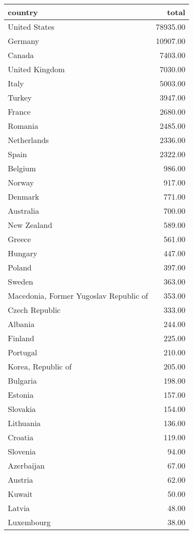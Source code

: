 \begin{table}[ht]
\centering
\begin{tabular}{lr}
  \hline
country & total \\ 
  \hline
United States & 78935.00 \\ 
  Germany & 10907.00 \\ 
  Canada & 7403.00 \\ 
  United Kingdom & 7030.00 \\ 
  Italy & 5003.00 \\ 
  Turkey & 3947.00 \\ 
  France & 2680.00 \\ 
  Romania & 2485.00 \\ 
  Netherlands & 2336.00 \\ 
  Spain & 2322.00 \\ 
  Belgium & 986.00 \\ 
  Norway & 917.00 \\ 
  Denmark & 771.00 \\ 
  Australia & 700.00 \\ 
  New Zealand & 589.00 \\ 
  Greece & 561.00 \\ 
  Hungary & 447.00 \\ 
  Poland & 397.00 \\ 
  Sweden & 363.00 \\ 
  Macedonia, Former Yugoslav Republic of & 353.00 \\ 
  Czech Republic & 333.00 \\ 
  Albania & 244.00 \\ 
  Finland & 225.00 \\ 
  Portugal & 210.00 \\ 
  Korea, Republic of & 205.00 \\ 
  Bulgaria & 198.00 \\ 
  Estonia & 157.00 \\ 
  Slovakia & 154.00 \\ 
  Lithuania & 136.00 \\ 
  Croatia & 119.00 \\ 
  Slovenia & 94.00 \\ 
  Azerbaijan & 67.00 \\ 
  Austria & 62.00 \\ 
  Kuwait & 50.00 \\ 
  Latvia & 48.00 \\ 
  Luxembourg & 38.00 \\ 

\end{tabular}
\end{table}
